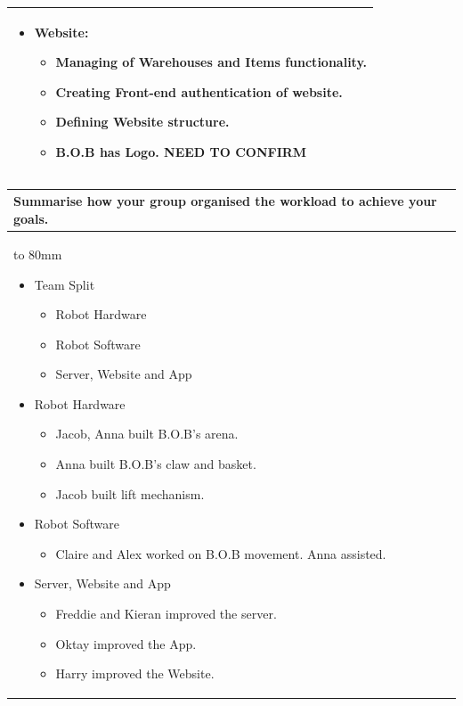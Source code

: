 \documentclass[a4paper]{article}
\newcommand{\colWidth}{141mm}
\begin{document}
\begin{center}
\begin{tabular}{|p{\colWidth}|}
{\begin{itemize}
\begin{itemize}
        \item More realistic User Interface.
    \end{itemize}
    \item Website: 
    \begin{itemize}
        \item Managing of Warehouses and Items functionality.
        \item Creating Front-end authentication of website. 
        \item Defining Website structure.
        \item B.O.B has Logo. \textbf{NEED TO CONFIRM}
    \end{itemize}
\end{itemize}
  }
  \\
  \hline
\end{tabular}
\vskip 5mm


\begin{tabular}{|p{\colWidth}|}
	\hline
	\cellcolor{blue!25}\large
	\textbf{Summarise how your group organised the workload to achieve your goals.}
	\\ \hline
	\vtop to 80mm{
	\begin{itemize}
	    \item Team Split
	    \begin{itemize}
	        \item Robot Hardware
	        \item Robot Software
	        \item Server, Website and App 
	    \end{itemize}
	    \item Robot Hardware
	    \begin{itemize}
	        \item Jacob, Anna built B.O.B's arena.
	        \item Anna built B.O.B's claw and basket.
	        \item Jacob built lift mechanism.
	    \end{itemize}
	    \item Robot Software
	    \begin{itemize}
	        \item Claire and Alex worked on B.O.B movement. Anna assisted. 
	    \end{itemize}
	    \item Server, Website and App 
	    \begin{itemize}
	        \item Freddie and Kieran improved the server.
	        \item Oktay improved the App.
	        \item Harry improved the Website.
	    \end{itemize}
	\end{itemize}
  }
  \\
  \hline
\end{tabular}
\vskip 5mm


\end{center}
\end{document}
